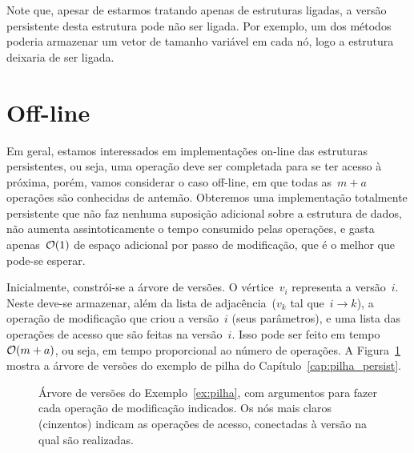 \documentclass[main.tex]{subfiles}
\begin{document}
Note que, apesar de estarmos tratando apenas de estruturas ligadas, a versão persistente desta estrutura pode não ser ligada. Por exemplo, um dos métodos poderia armazenar um vetor de tamanho variável em cada nó, logo a estrutura deixaria de ser ligada.

\section{Off-line}

Em geral, estamos interessados em implementações on-line das estruturas persistentes, ou seja, uma operação deve ser completada para se ter acesso à próxima, porém, vamos considerar o caso off-line, em que todas as~$m+a$ operações são conhecidas de antemão. Obteremos uma implementação totalmente persistente que não faz nenhuma suposição adicional sobre a estrutura de dados, não aumenta assintoticamente o tempo consumido pelas operações, e gasta apenas~$\mathcal{O}(1)$ de espaço adicional por passo de modificação, que é o melhor que pode-se esperar.

Inicialmente, constrói-se a árvore de versões. O vértice~$v_i$ representa a versão~$i$. Neste deve-se armazenar, além da lista de adjacência~($v_k$ tal que~$i \rightarrow k$), a operação de modificação que criou a versão~$i$ (seus parâmetros), e uma lista das operações de acesso que são feitas na versão~$i$. Isso pode ser feito em tempo~$\mathcal{O}(m+a)$, ou seja, em tempo proporcional ao número de operações.
A Figura~\ref{fig:vertree_ex} mostra a árvore de versões do exemplo de pilha do Capítulo~\ref{cap:pilha_persist}.

\begin{figure}
	\centering
	\caption{Árvore de versões do Exemplo~\ref{ex:pilha}, com argumentos para fazer cada operação de modificação indicados. Os nós mais claros (cinzentos) indicam as operações de acesso, conectadas à versão na qual são realizadas.} \label{fig:vertree_ex}
\end{figure}
\end{document}
